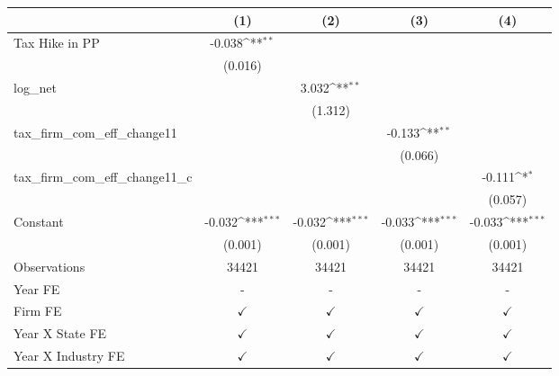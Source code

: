 {
\def\sym#1{\ifmmode^{#1}\else\(^{#1}\)\fi}
\begin{tabular}{l*{4}{c}}
\toprule
                    &\multicolumn{1}{c}{(1)}         &\multicolumn{1}{c}{(2)}         &\multicolumn{1}{c}{(3)}         &\multicolumn{1}{c}{(4)}         \\
\midrule
Tax Hike in PP      &      -0.038\sym{**} &                     &                     &                     \\
                    &     (0.016)         &                     &                     &                     \\
log\_net             &                     &       3.032\sym{**} &                     &                     \\
                    &                     &     (1.312)         &                     &                     \\
tax\_firm\_com\_eff\_change11&                     &                     &      -0.133\sym{**} &                     \\
                    &                     &                     &     (0.066)         &                     \\
tax\_firm\_com\_eff\_change11\_c&                     &                     &                     &      -0.111\sym{*}  \\
                    &                     &                     &                     &     (0.057)         \\
Constant            &      -0.032\sym{***}&      -0.032\sym{***}&      -0.033\sym{***}&      -0.033\sym{***}\\
                    &     (0.001)         &     (0.001)         &     (0.001)         &     (0.001)         \\
\midrule
Observations        &       34421         &       34421         &       34421         &       34421         \\
Year FE             &           -         &           -         &           -         &           -         \\
Firm FE             &$\checkmark$         &$\checkmark$         &$\checkmark$         &$\checkmark$         \\
Year X State FE     &$\checkmark$         &$\checkmark$         &$\checkmark$         &$\checkmark$         \\
Year X Industry FE  &$\checkmark$         &$\checkmark$         &$\checkmark$         &$\checkmark$         \\
\bottomrule
\end{tabular}
}
